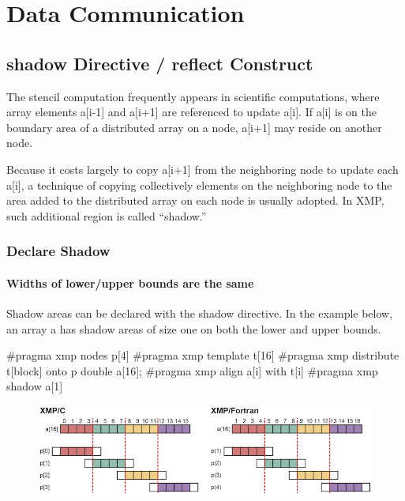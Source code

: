\section{Data Communication}

\subsection{{\bf shadow} Directive / {\bf reflect} Construct}

The stencil computation frequently appears in scientific computations,
where array elements a[i-1] and a[i+1] are referenced to update a[i]. If
a[i] is on the boundary area of a distributed array on a node, a[i+1]
may reside on another node.

Because it costs largely to copy a[i+1] from the neighboring node to
update each a[i], a technique of copying collectively elements on the
neighboring node to the area added to the distributed array on each node
is usually adopted. In XMP, such additional region is called “shadow.”

\subsubsection{Declare Shadow}

\paragraph{Widths of lower/upper bounds are the same}

Shadow areas can be declared with the shadow directive. In the example
below, an array a has shadow areas of size one on both the lower and
upper bounds.

\begin{XCexample}
#pragma xmp nodes p[4]
#pragma xmp template t[16]
#pragma xmp distribute t[block] onto p
double a[16];
#pragma xmp align a[i] with t[i]
#pragma xmp shadow a[1]
\end{XCexample}


\begin{figure}
  \centering
  \includegraphics{figs/shadow.png}
\end{figure}

